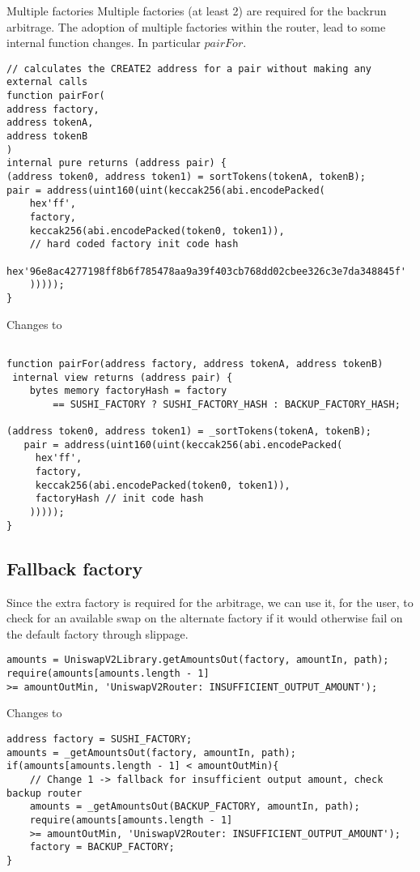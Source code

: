 \documentclass[runningheads]{llncs}
\begin{document}
Multiple factories
Multiple factories (at least 2) are required for the backrun arbitrage. The adoption of multiple factories within the router, lead to some internal function changes. In particular $pairFor$.

\label{CREATE2 Factory:3}
\begin{verbatim}
// calculates the CREATE2 address for a pair without making any external calls
function pairFor(
address factory, 
address tokenA, 
address tokenB
) 
internal pure returns (address pair) {
(address token0, address token1) = sortTokens(tokenA, tokenB);
pair = address(uint160(uint(keccak256(abi.encodePacked(
    hex'ff',
    factory,
    keccak256(abi.encodePacked(token0, token1)),
    // hard coded factory init code hash
    hex'96e8ac4277198ff8b6f785478aa9a39f403cb768dd02cbee326c3e7da348845f'
    )))));
}
\end{verbatim}

Changes to 
\begin{verbatim}

function pairFor(address factory, address tokenA, address tokenB) 
 internal view returns (address pair) {
    bytes memory factoryHash = factory
        == SUSHI_FACTORY ? SUSHI_FACTORY_HASH : BACKUP_FACTORY_HASH;

(address token0, address token1) = _sortTokens(tokenA, tokenB);
   pair = address(uint160(uint(keccak256(abi.encodePacked(
     hex'ff',
     factory,
     keccak256(abi.encodePacked(token0, token1)),
     factoryHash // init code hash
    )))));
}
\end{verbatim}

\subsection{Fallback factory}
Since the extra factory is required for the arbitrage, we can use it, for the user, to check for an available swap on the alternate factory if it would otherwise fail on the default factory through slippage.

\label{Fallback Factory:4}
\begin{verbatim}
amounts = UniswapV2Library.getAmountsOut(factory, amountIn, path);
require(amounts[amounts.length - 1]
>= amountOutMin, 'UniswapV2Router: INSUFFICIENT_OUTPUT_AMOUNT');
\end{verbatim}
Changes to
\begin{verbatim}
address factory = SUSHI_FACTORY;
amounts = _getAmountsOut(factory, amountIn, path);
if(amounts[amounts.length - 1] < amountOutMin){
    // Change 1 -> fallback for insufficient output amount, check backup router
    amounts = _getAmountsOut(BACKUP_FACTORY, amountIn, path);
    require(amounts[amounts.length - 1] 
    >= amountOutMin, 'UniswapV2Router: INSUFFICIENT_OUTPUT_AMOUNT');
    factory = BACKUP_FACTORY;
}
\end{verbatim}
\end{document}
